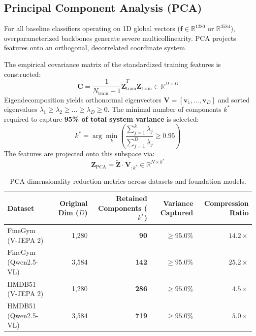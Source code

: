 \documentclass[a4paper, 11pt]{article}
\begin{document}
\subsection{Principal Component Analysis (PCA)}
For all baseline classifiers operating on 1D global vectors ($\mathbf{f} \in \mathbb{R}^{1280}$ or $\mathbb{R}^{3584}$), overparameterized backbones generate severe multicollinearity. PCA projects features onto an orthogonal, decorrelated coordinate system.

The empirical covariance matrix of the standardized training features is constructed:
\begin{equation}
    \mathbf{C} = \frac{1}{N_{\text{train}}-1}\tilde{\mathbf{Z}}_{\text{train}}^T \tilde{\mathbf{Z}}_{\text{train}} \in \mathbb{R}^{D \times D}
\end{equation}
Eigendecomposition yields orthonormal eigenvectors $\mathbf{V} = [\mathbf{v}_1, \dots, \mathbf{v}_D]$ and sorted eigenvalues $\lambda_1 \ge \lambda_2 \ge \dots \ge \lambda_D \ge 0$. The minimal number of components $k^*$ required to capture \textbf{95\% of total system variance} is selected:
\begin{equation}
    k^* = \arg\min_k \left( \frac{\sum_{j=1}^k \lambda_j}{\sum_{j=1}^D \lambda_j} \ge 0.95 \right)
\end{equation}
The features are projected onto this subspace via:
\begin{equation}
    \mathbf{Z}_{\text{PCA}} = \tilde{\mathbf{Z}} \cdot \mathbf{V}_{:k^*} \in \mathbb{R}^{N \times k^*}
\end{equation}

\begin{table}[h!]
\centering
\small
\begin{tabular}{lrrrr}
\toprule
\textbf{Dataset} & \textbf{Original Dim ($D$)} & \textbf{Retained Components ($k^*$)} & \textbf{Variance Captured} & \textbf{Compression Ratio} \\
\midrule
FineGym (V-JEPA 2) & 1,280 & \textbf{90} & $\ge 95.0\%$ & $14.2 \times$ \\
FineGym (Qwen2.5-VL) & 3,584 & \textbf{142} & $\ge 95.0\%$ & $25.2 \times$ \\
HMDB51 (V-JEPA 2) & 1,280 & \textbf{286} & $\ge 95.0\%$ & $4.5 \times$ \\
HMDB51 (Qwen2.5-VL) & 3,584 & \textbf{719} & $\ge 95.0\%$ & $5.0 \times$ \\
\bottomrule
\end{tabular}
\caption{PCA dimensionality reduction metrics across datasets and foundation models.}
\end{table}
\end{document}

